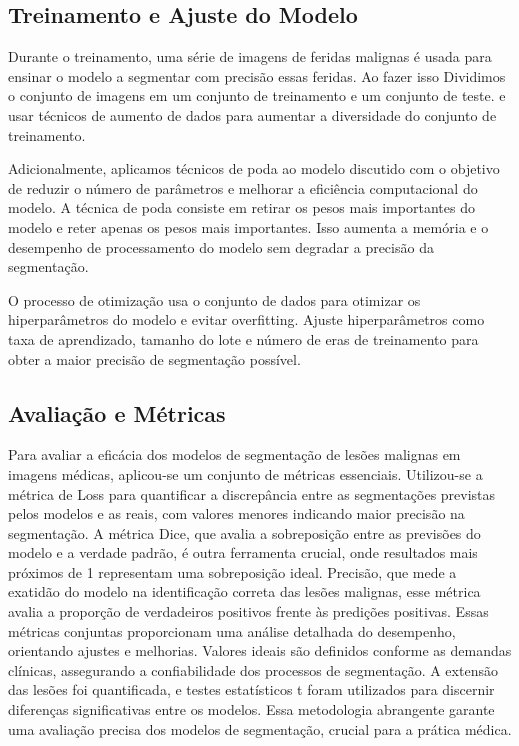 \subsection{Treinamento e Ajuste do Modelo}

    Durante o treinamento, uma série de imagens de feridas malignas é usada para ensinar o modelo a segmentar com precisão essas feridas. Ao fazer isso Dividimos o conjunto de imagens em um conjunto de treinamento e um conjunto de teste. e usar técnicos de aumento de dados para aumentar a diversidade do conjunto de treinamento.

    Adicionalmente, aplicamos técnicos de poda ao modelo discutido com o objetivo de reduzir o número de parâmetros e melhorar a eficiência computacional do modelo. A técnica de poda consiste em retirar os pesos mais importantes do modelo e reter apenas os pesos mais importantes. Isso aumenta a memória e o desempenho de processamento do modelo sem degradar a precisão da segmentação.

    O processo de otimização usa o conjunto de dados para otimizar os hiperparâmetros do modelo e evitar overfitting. Ajuste hiperparâmetros como taxa de aprendizado, tamanho do lote e número de eras de treinamento para obter a maior precisão de segmentação possível.

\subsection{Avaliação e Métricas}
    Para avaliar a eficácia dos modelos de segmentação de lesões malignas em imagens médicas, aplicou-se um conjunto de métricas essenciais. Utilizou-se a métrica de Loss para quantificar a discrepância entre as segmentações previstas pelos modelos e as reais, com valores menores indicando maior precisão na segmentação. A métrica Dice, que avalia a sobreposição entre as previsões do modelo e a verdade padrão, é outra ferramenta crucial, onde resultados mais próximos de 1 representam uma sobreposição ideal. Precisão, que mede a exatidão do modelo na identificação correta das lesões malignas, esse métrica avalia a proporção de verdadeiros positivos frente às predições positivas. Essas métricas conjuntas proporcionam uma análise detalhada do desempenho, orientando ajustes e melhorias. Valores ideais são definidos conforme as demandas clínicas, assegurando a confiabilidade dos processos de segmentação. A extensão das lesões foi quantificada, e testes estatísticos t foram utilizados para discernir diferenças significativas entre os modelos. Essa metodologia abrangente garante uma avaliação precisa dos modelos de segmentação, crucial para a prática médica.

